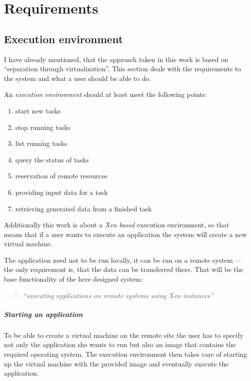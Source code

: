 \chapter{Requirements}
\label{cha:requirements}


\section{Execution environment}

I have already mentioned, that the approach taken in this work is based on
``separation  through  virtualization''.   This  section  deals  with  the
requirements to  the system  and what a  user should  be able to  do.

An \emph{execution environment} should at least meet the following points:
\begin{enumerate}
\item start new tasks
\item stop running tasks
\item list running tasks
\item query the status of tasks
\item reservation of remote resources
\item providing input data for a task
\item retrieving generated data from a finished task
\end{enumerate}

Additionally this work is  about a \emph{Xen based} execution environment,
so that  means that if a user  wants to execute an  application the system
will create a new virtual machine.

The application  need not to  be run  locally, it can  be run on  a remote
system  --- the  only requirement  is, that  the data  can  be transferred
there.  That will be the base functionality of the here designed system:

\begin{quote}
  \emph{``executing applications on remote systems using Xen instances''}
\end{quote}

\paragraph{Starting an application}

To be able to create a virtual  machine on the remote site the user has to
specify not only  the application she wants to run but  also an image that
contains the  required operating  system.  The execution  environment then
takes care of starting up the  virtual machine with the provided image and
eventually execute the application.

